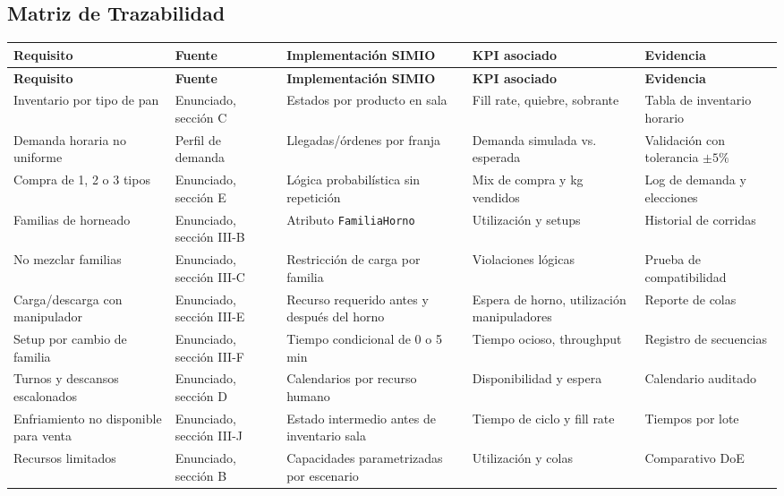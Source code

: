 \documentclass[11pt,letterpaper]{article}
\begin{document}
\subsection{Matriz de Trazabilidad}

\small
\begin{longtable}{L{2.55cm}L{2.75cm}L{3.05cm}L{2.75cm}L{2.75cm}}
  \toprule
  \textbf{Requisito} & \textbf{Fuente} & \textbf{Implementación SIMIO} & \textbf{KPI asociado} & \textbf{Evidencia} \\
  \midrule
  \endfirsthead
  \toprule
  \textbf{Requisito} & \textbf{Fuente} & \textbf{Implementación SIMIO} & \textbf{KPI asociado} & \textbf{Evidencia} \\
  \midrule
  \endhead
  Inventario por tipo de pan & Enunciado, sección C & Estados por producto en sala & Fill rate, quiebre, sobrante & Tabla de inventario horario \\
  Demanda horaria no uniforme & Perfil de demanda & Llegadas/órdenes por franja & Demanda simulada vs. esperada & Validación con tolerancia \(\pm 5\%\) \\
  Compra de 1, 2 o 3 tipos & Enunciado, sección E & Lógica probabilística sin repetición & Mix de compra y kg vendidos & Log de demanda y elecciones \\
  Familias de horneado & Enunciado, sección III-B & Atributo \texttt{FamiliaHorno} & Utilización y setups & Historial de corridas \\
  No mezclar familias & Enunciado, sección III-C & Restricción de carga por familia & Violaciones lógicas & Prueba de compatibilidad \\
  Carga/descarga con manipulador & Enunciado, sección III-E & Recurso requerido antes y después del horno & Espera de horno, utilización manipuladores & Reporte de colas \\
  Setup por cambio de familia & Enunciado, sección III-F & Tiempo condicional de 0 o 5 min & Tiempo ocioso, throughput & Registro de secuencias \\
  Turnos y descansos escalonados & Enunciado, sección D & Calendarios por recurso humano & Disponibilidad y espera & Calendario auditado \\
  Enfriamiento no disponible para venta & Enunciado, sección III-J & Estado intermedio antes de inventario sala & Tiempo de ciclo y fill rate & Tiempos por lote \\
  Recursos limitados & Enunciado, sección B & Capacidades parametrizadas por escenario & Utilización y colas & Comparativo DoE \\
  \bottomrule
\end{longtable}
\normalsize
\end{document}
